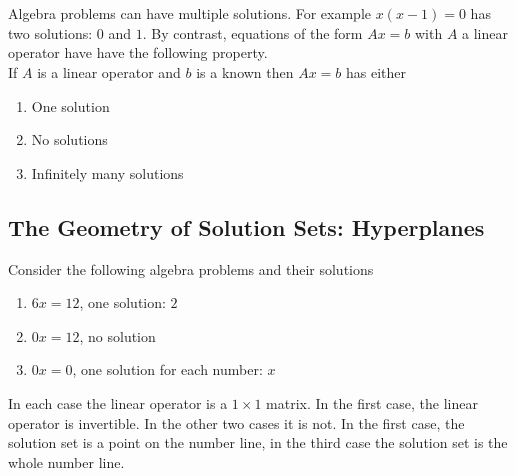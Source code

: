 \chapter{\solutionSetsTitle}

Algebra problems can have multiple solutions. For example $x(x-1)=0$ has  two solutions: $0$ and $1$. By contrast, equations of the form $Ax=b$ with $A$ a linear operator have have the following property.\\



If $A$ is a linear operator and $b$ is a known then $Ax=b$ has either
\begin{enumerate}
\item One solution
\item  No solutions
\item Infinitely many solutions
\end{enumerate}


\section{The Geometry of Solution Sets: Hyperplanes}
Consider the following algebra problems and their solutions

\begin{enumerate}
\item $6x=12$, one solution: $2$
\item $0x=12$, no solution
\item $0x=0$, one solution for each number: $x$
\end{enumerate}
In each case the linear operator is a $1\times 1$ matrix. In the first case, the linear operator is invertible. 
In the other two cases it is not. 
In the first case, the solution set is a point on the number line, in the third case the solution set is the whole number line.


